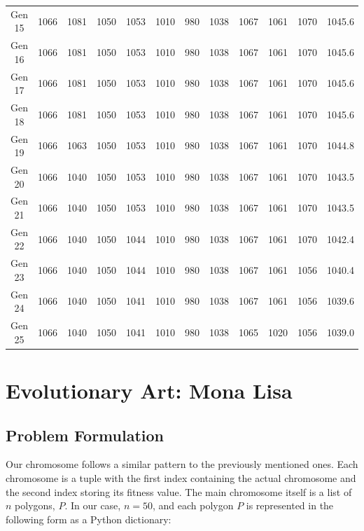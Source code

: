 \documentclass[12pt]{article}
\begin{document}
\begin{table}[h]
\begin{adjustbox}{max width=1\textwidth}
\begin{tabular}{*{12}{c}}
            Gen 15 & 1066 & 1081 & 1050 & 1053 & 1010 & 980 & 1038 & 1067 & 1061 & 1070 & 1045.6 \\
            Gen 16 & 1066 & 1081 & 1050 & 1053 & 1010 & 980 & 1038 & 1067 & 1061 & 1070 & 1045.6 \\
            Gen 17 & 1066 & 1081 & 1050 & 1053 & 1010 & 980 & 1038 & 1067 & 1061 & 1070 & 1045.6 \\
            Gen 18 & 1066 & 1081 & 1050 & 1053 & 1010 & 980 & 1038 & 1067 & 1061 & 1070 & 1045.6 \\
            Gen 19 & 1066 & 1063 & 1050 & 1053 & 1010 & 980 & 1038 & 1067 & 1061 & 1070 & 1044.8 \\
            Gen 20 & 1066 & 1040 & 1050 & 1053 & 1010 & 980 & 1038 & 1067 & 1061 & 1070 & 1043.5 \\
            Gen 21 & 1066 & 1040 & 1050 & 1053 & 1010 & 980 & 1038 & 1067 & 1061 & 1070 & 1043.5 \\
            Gen 22 & 1066 & 1040 & 1050 & 1044 & 1010 & 980 & 1038 & 1067 & 1061 & 1070 & 1042.4 \\
            Gen 23 & 1066 & 1040 & 1050 & 1044 & 1010 & 980 & 1038 & 1067 & 1061 & 1056 & 1040.4 \\
            Gen 24 & 1066 & 1040 & 1050 & 1041 & 1010 & 980 & 1038 & 1067 & 1061 & 1056 & 1039.6 \\
            Gen 25 & 1066 & 1040 & 1050 & 1041 & 1010 & 980 & 1038 & 1065 & 1020 & 1056 & 1039.0 \\
            \bottomrule
        \end{tabular}
    \end{adjustbox}
\end{table}

\newpage

\section{Evolutionary Art: Mona Lisa}

\subsection{Problem Formulation}

Our chromosome follows a similar pattern to the previously mentioned ones. Each chromosome is a tuple with the first index containing the actual chromosome and the second index storing its fitness value. The main chromosome itself is a list of \( n \) polygons, \( P \). In our case, \( n = 50 \), and each polygon \( P \) is represented in the following form as a Python dictionary:
\end{document}
